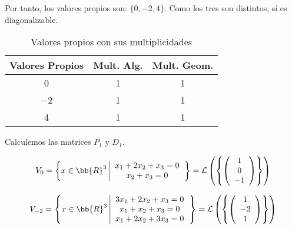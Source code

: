 \begin{ejercicio}
\begin{enumerate}
\begin{enumerate}
            Por tanto, los valores propios son: $\{0,-2,4\}$. Como los tres son distintos, sí es diagonalizable.
            \begin{table}[H]
                \centering
                \begin{tabular}{c|c|c}
                    Valores Propios & Mult. Alg. & Mult. Geom. \\ \hline 
                    0 & 1 & 1\\
                    $-$2 & 1 & 1\\
                    4 & 1 & 1\\
                \end{tabular}
                \caption{Valores propios con sus multiplicidades}
            \end{table}
            
            Calculemos las matrices $P_1$ y $D_1$.
    
            \begin{equation*}
            V_0 = \left\{x\in\bb{R}^3 \left| \begin{array}{c}
                 x_1+2x_2+x_3=0  \\
                 x_2+x_3 = 0
            \end{array}\right.\right\} = \mathcal{L}\left(\left\{ \left(\begin{array}{c}
                    1 \\
                    0 \\
                    -1 \\
               \end{array}\right)
               \right\}\right)
            \end{equation*}
    
            \begin{equation*}
            V_{-2} = \left\{x\in\bb{R}^3 \left| \begin{array}{c}
                 3x_1+2x_2+x_3=0  \\
                 x_1+x_2+x_3=0 \\
                 x_1+2x_2+3x_3 = 0
            \end{array}\right.\right\} = \mathcal{L}\left(\left\{ \left(\begin{array}{c}
                    1 \\
                    -2 \\
                    1 \\
               \end{array}\right)
               \right\}\right)
            \end{equation*}
    

\end{enumerate}
\end{enumerate}
\end{ejercicio}
